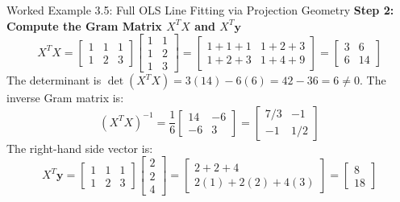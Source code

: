 \begin{examplebox}{Worked Example 3.5: Full OLS Line Fitting via Projection Geometry}
\textbf{Step 2: Compute the Gram Matrix $X^T X$ and $X^T \mathbf{y}$}
\begin{equation*}
X^T X = \begin{bmatrix} 1 & 1 & 1 \\ 1 & 2 & 3 \end{bmatrix} \begin{bmatrix} 1 & 1 \\ 1 & 2 \\ 1 & 3 \end{bmatrix} = \begin{bmatrix} 1+1+1 & 1+2+3 \\ 1+2+3 & 1+4+9 \end{bmatrix} = \begin{bmatrix} 3 & 6 \\ 6 & 14 \end{bmatrix}
\end{equation*}
The determinant is $\det(X^T X) = 3(14) - 6(6) = 42 - 36 = 6 \ne 0$.
The inverse Gram matrix is:
\begin{equation*}
(X^T X)^{-1} = \frac{1}{6} \begin{bmatrix} 14 & -6 \\ -6 & 3 \end{bmatrix} = \begin{bmatrix} 7/3 & -1 \\ -1 & 1/2 \end{bmatrix}
\end{equation*}
The right-hand side vector is:
\begin{equation*}
X^T \mathbf{y} = \begin{bmatrix} 1 & 1 & 1 \\ 1 & 2 & 3 \end{bmatrix} \begin{bmatrix} 2 \\ 2 \\ 4 \end{bmatrix} = \begin{bmatrix} 2 + 2 + 4 \\ 2(1) + 2(2) + 4(3) \end{bmatrix} = \begin{bmatrix} 8 \\ 18 \end{bmatrix}
\end{equation*}


\end{examplebox}
